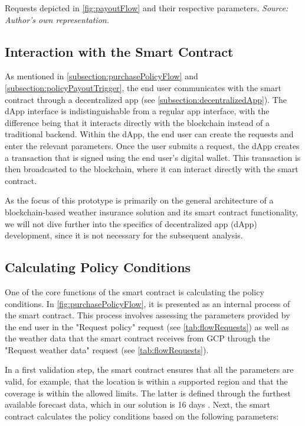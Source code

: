 \begin{table}[ht]
    \centering
    
    \caption{Requests depicted in \cref{fig:payoutFlow} and their respective parameters. \textit{Source: Author's own representation.}}
    \label{tab:payoutFlowRequests}
\end{table}

\subsection{Interaction with the Smart Contract}\label{interaction_with_smartcontract}
As mentioned in \cref{subsection:purchasePolicyFlow} and \cref{subsection:policyPayoutTrigger}, the end user communicates with the smart contract through a decentralized app (see \cref{subsection:decentralizedApp}). The dApp interface is indistinguishable from a regular app interface, with the difference being that it interacts directly with the blockchain instead of a traditional backend. Within the dApp, the end user can create the requests and enter the relevant parameters. Once the user submits a request, the dApp creates a transaction that is signed using the end user's digital wallet. This transaction is then broadcasted to the blockchain, where it can interact directly with the smart contract.

As the focus of this prototype is primarily on the general architecture of a blockchain-based weather insurance solution and its smart contract functionality, we will not dive further into the specifics of decentralized app (dApp) development, since it is not necessary for the subsequent analysis.

\subsection{Calculating Policy Conditions}
One of the core functions of the smart contract is calculating the policy conditions. In \cref{fig:purchasePolicyFlow}, it is presented as an internal process of the smart contract. This process involves assessing the parameters provided by the end user in the "Request policy" request (see \cref{tab:flowRequests}) as well as the weather data that the smart contract receives from GCP through the "Request weather data" request (see \cref{tab:flowRequests}).

In a first validation step, the smart contract ensures that all the parameters are valid, for example, that the location is within a supported region and that the coverage is within the allowed limits. The latter is defined through the furthest available forecast data, which in our solution is 16 days \autocite{NOAA_GFS}. Next, the smart contract calculates the policy conditions based on the following parameters:

